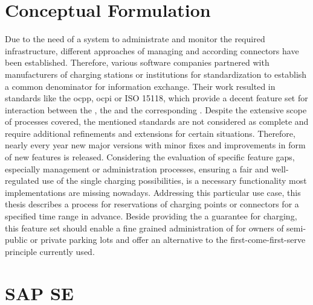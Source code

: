 \section{Conceptual Formulation}
\label{ch:Introduction:sec:Conceptual Formulation}

Due to the need of a system to administrate and monitor the required infrastructure, different approaches of managing  and according connectors have been established. Therefore, various software companies partnered with manufacturers of charging stations or institutions for standardization to establish a common denominator for information exchange.
Their work resulted in standards like the \acrfull{ocpp}, \acrfull{ocpi} or ISO 15118, which provide a decent feature set for interaction between the , the  and the corresponding . Despite the extensive scope of processes covered, the mentioned standards are not considered as complete and require additional refinements and extensions for certain situations.
Therefore, nearly every year new major versions with minor fixes and improvements in form of new features is released. 
Considering the evaluation of specific feature gaps, especially management or administration processes, ensuring a fair and well-regulated use of the single charging possibilities, is a necessary functionality most implementations are missing nowadays. Addressing this particular use case, this thesis describes a process for reservations of charging points or connectors for a specified time range in advance. Beside providing the  a guarantee for charging, this feature set should enable a fine grained administration of  for owners of semi-public or private parking lots and offer an alternative to the first-come-first-serve principle currently used.

\section{SAP SE}
\label{ch:Introduction:sec:SAP SE}


